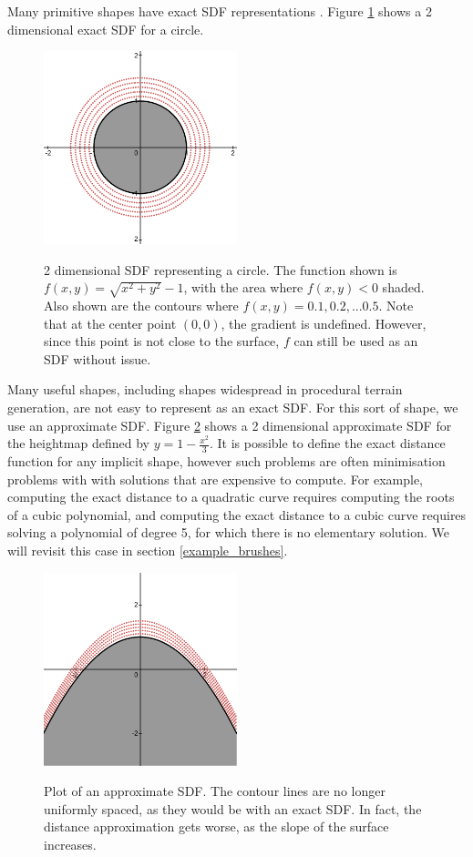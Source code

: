 \documentclass[11pt]{article}
\begin{document}
Many primitive shapes have exact SDF representations \cite{quilez:sdf}. Figure \ref{fig:Circle_SDF} shows a 2 dimensional exact SDF for a circle.

\begin{figure}
\caption{2 dimensional SDF representing a circle. The function shown is $f\left(x,y\right) = \sqrt{x^2+y^2}-1$, with the area where $f\left(x,y\right) < 0 $ shaded. Also shown are the contours where $f\left(x,y\right) = 0.1,0.2,...0.5$. Note that at the center point $\left(0,0\right)$, the gradient is undefined. However, since this point is not close to the surface, $f$ can still be used as an SDF without issue.}
\includegraphics[width=0.5\textwidth]{Circle_SDF}
\label{fig:Circle_SDF}
\end{figure}

Many useful shapes, including shapes widespread in procedural terrain generation, are not easy to represent as an exact SDF. For this sort of shape, we use an approximate SDF. Figure \ref{fig:Hill_SDF} shows a 2 dimensional approximate SDF for the heightmap defined by $y=1-\frac{x^2}{3}$. It is possible to define the exact distance function for any implicit shape, however such problems are often minimisation problems with with solutions that are expensive to compute. For example, computing the exact distance to a quadratic curve requires computing the roots of a cubic polynomial, and computing the exact distance to a cubic curve requires solving a polynomial of degree 5, for which there is no elementary solution. We will revisit this case in section \ref{example_brushes}.

\begin{figure}
\caption{Plot of an approximate SDF. The contour lines are no longer uniformly spaced, as they would be with an exact SDF. In fact, the distance approximation gets worse, as the slope of the surface increases.}
\includegraphics[width=0.5\textwidth]{Hill_SDF}
\label{fig:Hill_SDF}
\end{figure}
\end{document}

